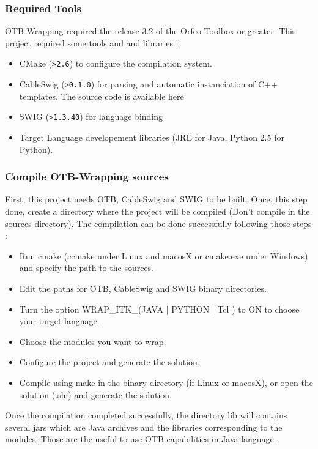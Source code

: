 \subsubsection{Required Tools}
OTB-Wrapping required the release 3.2 of the Orfeo Toolbox or greater. This project required some tools and 
and libraries : 
\begin{itemize}
\item CMake (\verb!>2.6!) to configure the compilation system.
\item CableSwig (\verb!>0.1.0!) for parsing and automatic instanciation of C++ templates. The source code is available 
  here
\item SWIG  (\verb!>1.3.40!) for language binding
\item Target Language developement libraries (JRE for Java, Python 2.5 for Python).
\end{itemize}

\subsubsection{Compile OTB-Wrapping sources}
First, this project needs OTB, CableSwig and SWIG to be built. Once, this step done, create a 
directory where the project will be compiled (Don't compile in the sources directory).
The compilation can be done successfully following those steps :

\begin{itemize}
\item Run cmake (ccmake under Linux and macosX or cmake.exe under Windows) and specify the path to the sources.
\item Edit the paths for OTB, CableSwig and SWIG binary directories.
\item Turn the option WRAP\_ITK\_(JAVA | PYTHON | Tcl  )  to ON to choose your target language.
\item Choose the modules you want to wrap.
\item Configure the project and generate the solution.
\item Compile using make in the binary directory (if Linux or macosX), or open the solution (.sln) and generate the solution.
\end{itemize}

Once the compilation completed successfully, the directory lib will contains several jars which are Java archives 
and the libraries corresponding to the modules. Those are the useful to use OTB capabilities in Java language.

